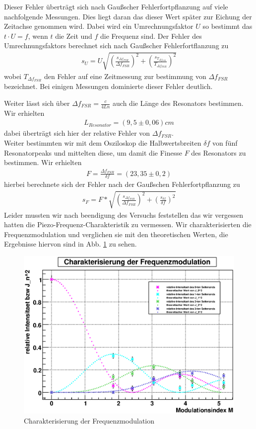 \documentclass[12pt]{article}
\begin{document}
Dieser Fehler überträgt sich nach Gaußscher Fehlerfortpflanzung auf viele nachfolgende Messungen. Dies liegt daran das dieser Wert später zur Eichung der Zeitachse genommen wird. Dabei wird ein Umrechnungsfaktor $U$ so bestimmt das $t\cdot U=f$, wenn $t$ die Zeit und $f$ die Frequenz sind. Der Fehler des Umrechnungsfaktors berechnet sich nach Gaußscher Fehlerfortflanzung zu
\begin{align*}
 s_U = U \sqrt{ \left( \frac{s_{\Delta f_{FSR}}}{\Delta f_{FSR}} \right) ^2 + \left( \frac{s_{T_{\Delta f_{FSR}}}}{T_{\Delta f_{FSR}}} \right) ^2 }
\end{align*}
wobei $T_{\Delta f_{FSR}}$ den Fehler auf eine Zeitmessung zur bestimmung von $\Delta f_{FSR}$ bezeichnet. Bei einigen Messungen dominierte dieser Fehler deutlich.

Weiter lässt sich über $\Delta f_{FSR} = \frac{c}{4Ln}$ auch die Länge des Resonators bestimmen. Wir erhielten
\begin{align*}
 L_{Resonator}= (9,5 \pm 0,06) cm
\end{align*}
dabei überträgt sich hier der relative Fehler von $\Delta f_{FSR}$.  \\
Weiter bestimmten wir mit dem Osziloskop die Halbwertsbreiten $\delta f$ von fünf Resonatorpeaks und mittelten diese, um damit die Finesse $F$ des Resonators zu bestimmen. Wir erhielten 
\begin{align*}
 F = \frac{\Delta f_{FSR}}{\delta f} = ( 23,35 \pm 0,2 )
\end{align*}
hierbei berechnete sich der Fehler nach der Gaußschen Fehlerfortpflanzung zu
\begin{align*}
 s_F = F * \sqrt{ \left( \frac{s_{\Delta f_{FSR}}}{\Delta f_{FSR}} \right)^2 + \left( \frac{s_{\delta f}}{\delta f} \right)^2}
\end{align*}
Leider mussten wir nach beendigung des Versuchs feststellen das wir vergessen hatten die Piezo-Frequenz-Charakteristik zu vermessen. 
Wir charakterisierten die Frequenzmodulation und verglichen sie mit den theoretischen Werten, die Ergebnisse hiervon sind in Abb. \ref{bessel} zu sehen.
\begin{figure}[H]
 \includegraphics[width=0.9\linewidth]{pictures/modulation.eps}
 \caption{Charakterisierung der Frequenzmodulation}
 \label{bessel}
\end{figure}
\end{document}
